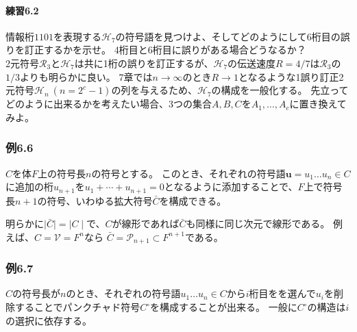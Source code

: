 \documentclass[12pt,a4paper]{article}
\begin{document}
\paragraph{練習6.2}\label{ux7df4ux7fd26.2}

情報桁\(1101\)を表現する\(\mathcal{H}_7\)の符号語を見つけよ、そしてどのようにして6桁目の誤りを訂正するかを示せ。
4桁目と6桁目に誤りがある場合どうなるか？\\

2元符号\(\mathcal{R}_3\)と\(\mathcal{H}_7\)は共に1桁の誤りを訂正するが、\(\mathcal{H}_7\)の伝送速度\(R = 4/7\)は\(\mathcal{R}_3\)の\(1/3\)よりも明らかに良い。
7章では\(n \rightarrow \infty\)のとき\(R \rightarrow 1\)となるような1誤り訂正2元符号\(\mathcal{H}_n \ (n = 2^c -1)\)の列を与えるため、\(\mathcal{H}_7\)の構成を一般化する。
先立ってどのように出来るかを考えたい場合、3つの集合\(A,B,C\)を\(A_1 , \dots , A_c\)に置き換えてみよ。

\subsubsection*{例6.6}\label{ux4f8b6.6}

\(C\)を体\(F\)上の符号長\(n\)の符号とする。
このとき、それぞれの符号語\(\mathbf{u} = u_1 \dots u_n \in C\)に追加の桁\(u_{n+1}\)を\(u_1 + \cdots + u_{n+1} = 0\)となるように添加することで、\(F\)上で符号長\(n + 1\)の符号、いわゆる拡大符号\(\bar{C}\)を構成できる。

明らかに\(\mid \bar{C} \mid = \mid C \mid\)で、\(C\)が線形であれば\(\bar{C}\)も同様に同じ次元で線形である。
例えば、\(C = \mathcal{V} = F^n\)なら
\(\bar{C} = \mathcal{P}_{n+1} \subset F^{n+1}\)である。

\subsubsection*{例6.7}\label{ux4f8b6.6-1}

\(C\)の符号長が\(n\)のとき、それぞれの符号語\(u_1 \dots u_n \in C\)から\(i\)桁目をを選んで\(u_i\)を削除することでパンクチャド符号\(C^\circ\)を構成することが出来る。
一般に\(C^\circ\)の構造は\(i\)の選択に依存する。
\end{document}
